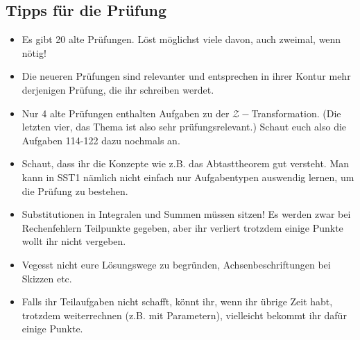 \documentclass[11pt]{article}
\begin{document}
\subsection*{Tipps für die Prüfung}
\vspace*{-0.5cm}
\begin{itemize}
    \item Es gibt 20 alte Prüfungen. Löst möglichst viele davon, auch zweimal, wenn nötig!
    \item Die neueren Prüfungen sind relevanter und entsprechen in ihrer Kontur mehr derjenigen Prüfung, die ihr schreiben werdet.
    \item Nur 4 alte Prüfungen enthalten Aufgaben zu der $\mathcal{Z}-$Transformation. (Die letzten vier, das Thema ist also sehr prüfungsrelevant.) Schaut euch also die Aufgaben 114-122 dazu nochmals an.
    \item Schaut, dass ihr die Konzepte wie z.B. das Abtasttheorem gut versteht. Man kann in SST1 nämlich nicht einfach nur Aufgabentypen auswendig lernen, um die Prüfung zu bestehen.
    \item Substitutionen in Integralen und Summen müssen sitzen! Es werden zwar bei Rechenfehlern Teilpunkte gegeben, aber ihr verliert trotzdem einige  Punkte wollt ihr nicht vergeben.
    \item Vegesst nicht eure Lösungswege zu begründen, Achsenbeschriftungen bei Skizzen etc.
    \item Falls ihr Teilaufgaben nicht schafft, könnt ihr, wenn ihr übrige Zeit habt, trotzdem weiterrechnen (z.B. mit Parametern), vielleicht bekommt ihr dafür einige Punkte.
\end{itemize}
\end{document}

